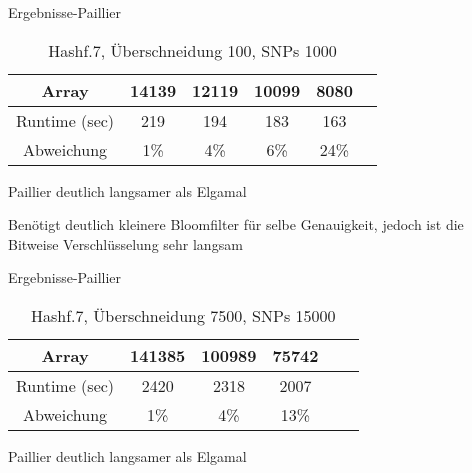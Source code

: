 \documentclass{beamer}
\begin{document}
\begin{frame}{Ergebnisse-Paillier}
	\begin{table}[h]
		
		\begin{tabular}{c|c|c|c|c|c}
			Array&14139&12119&10099&8080\\
			\hline
			Runtime (sec)&219&194&183&163\\
			Abweichung&1\%&4\%&6\%&24\%\\
			
			
		\end{tabular}
		\caption{Hashf.7, Überschneidung 100, SNPs 1000 }
		\label{tab:meinetabelle5}
	\end{table}
	
	\begin{arrowlist}
		\item Paillier deutlich langsamer als Elgamal
		\item Benötigt deutlich kleinere Bloomfilter für selbe Genauigkeit, jedoch ist die Bitweise Verschlüsselung sehr langsam
	\end{arrowlist}
\end{frame}
\begin{frame}{Ergebnisse-Paillier}
	\begin{table}[h]
		
		\begin{tabular}{c|c|c|c|c|c}
			Array&141385&100989&75742\\
			\hline
			Runtime (sec)&2420&2318&2007\\
			Abweichung&1\%&4\%& 13\%\\
			
			
		\end{tabular}
		\caption{Hashf.7, Überschneidung 7500, SNPs 15000 }
		\label{tab:meinetabelle6}
	\end{table}
	
	\begin{arrowlist}
		\item Paillier deutlich langsamer als Elgamal

		
	\end{arrowlist}

\end{frame}
\end{document}
